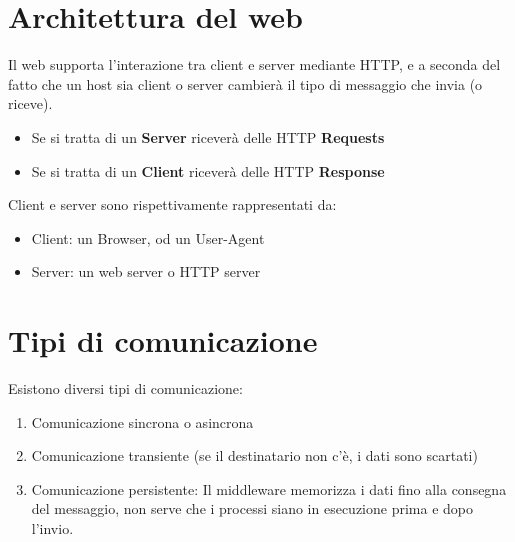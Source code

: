 \documentclass[12pt, a4paper, openany, twoside]{book}
\begin{document}
\section{Architettura del web}
Il web supporta l'interazione tra client e server mediante HTTP, e a seconda del
fatto che un host sia client o server cambierà il tipo di messaggio che invia
(o riceve). 
\begin{itemize}
	\item Se si tratta di un \textbf{Server} riceverà delle HTTP \textbf{Requests}
	\item Se si tratta di un \textbf{Client} riceverà delle HTTP \textbf{Response}
\end{itemize}
Client e server sono rispettivamente rappresentati da:
\begin{itemize}
	\item Client: un Browser, od un User-Agent
	\item Server: un web server o HTTP server
\end{itemize}
\section{Tipi di comunicazione}
Esistono diversi tipi di comunicazione:
\begin{enumerate}
	\item Comunicazione sincrona o asincrona
	\item Comunicazione transiente (se il destinatario non c'è, i dati sono 
	scartati)
	\item Comunicazione persistente: Il middleware memorizza i dati fino alla consegna
	del messaggio, non serve che i processi siano in esecuzione prima e dopo l'invio.
\end{enumerate}
\end{document}
